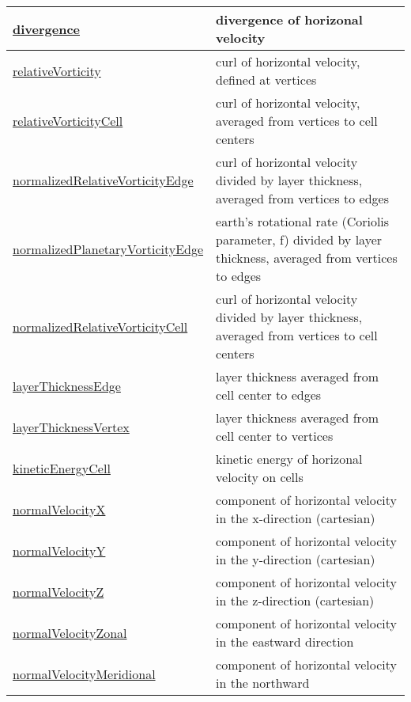 {\begin{center}
\begin{longtable}{| p{2.0in} | p{4.0in} |}
	\hline
	\hyperref[subsec:var_sec_state_divergence]{divergence} & divergence of horizonal velocity \\
	\hline
	\hyperref[subsec:var_sec_state_relativeVorticity]{relativeVorticity} & curl of horizontal velocity, defined at vertices \\
	\hline
	\hyperref[subsec:var_sec_state_relativeVorticityCell]{relativeVorticityCell} & curl of horizontal velocity, averaged from vertices to cell centers \\
	\hline
	\hyperref[subsec:var_sec_state_normalizedRelativeVorticityEdge]{normalizedRelativeVorticityEdge} & curl of horizontal velocity divided by layer thickness, averaged from vertices to edges \\
	\hline
	\hyperref[subsec:var_sec_state_normalizedPlanetaryVorticityEdge]{normalizedPlanetaryVorticityEdge} & earth's rotational rate (Coriolis parameter, f) divided by layer thickness, averaged from vertices to edges \\
	\hline
	\hyperref[subsec:var_sec_state_normalizedRelativeVorticityCell]{normalizedRelativeVorticityCell} & curl of horizontal velocity divided by layer thickness, averaged from vertices to cell centers \\
	\hline
	\hyperref[subsec:var_sec_state_layerThicknessEdge]{layerThicknessEdge} & layer thickness averaged from cell center to edges \\
	\hline
	\hyperref[subsec:var_sec_state_layerThicknessVertex]{layerThicknessVertex} & layer thickness averaged from cell center to vertices \\
	\hline
	\hyperref[subsec:var_sec_state_kineticEnergyCell]{kineticEnergyCell} & kinetic energy of horizonal velocity on cells \\
	\hline
	\hyperref[subsec:var_sec_state_normalVelocityX]{normalVelocityX} & component of horizontal velocity in the x-direction (cartesian) \\
	\hline
	\hyperref[subsec:var_sec_state_normalVelocityY]{normalVelocityY} & component of horizontal velocity in the y-direction (cartesian) \\
	\hline
	\hyperref[subsec:var_sec_state_normalVelocityZ]{normalVelocityZ} & component of horizontal velocity in the z-direction (cartesian) \\
	\hline
	\hyperref[subsec:var_sec_state_normalVelocityZonal]{normalVelocityZonal} & component of horizontal velocity in the eastward direction \\
	\hline
	\hyperref[subsec:var_sec_state_normalVelocityMeridional]{normalVelocityMeridional} & component of horizontal velocity in the northward \\

\end{longtable}
\end{center}}
